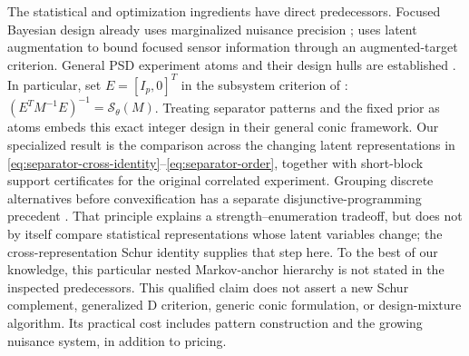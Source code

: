 The statistical and optimization ingredients have direct predecessors.
Focused Bayesian design already uses marginalized nuisance precision
\citep{Alexanderian2021}; \citet[Section 7]{LevineHow2013} uses latent
augmentation to bound focused sensor information through an augmented-target
criterion. General PSD experiment atoms and their design hulls are established
\citep{HarmanTrnovska2009,Filova2026}. In particular, set
$E=[I_p,0]^T$ in the subsystem criterion of
\citet[Theorem 4.3 and Corollaries 4.4--4.5]{Sagnol2015}:
$(E^TM^{-1}E)^{-1}=\mathcal S_\theta(M)$.
Treating separator patterns and the fixed prior as atoms embeds this exact
integer design in their general conic framework. Our specialized result is
the comparison across the changing latent representations in
\eqref{eq:separator-cross-identity}--\eqref{eq:separator-order}, together
with short-block support certificates for the original correlated experiment.
Grouping discrete alternatives before convexification has a separate
disjunctive-programming precedent \citep{Balas1985,Papageorgiou2025}. That
principle explains a strength--enumeration tradeoff, but does not by itself
compare statistical representations whose latent variables change; the
cross-representation Schur identity supplies that step here.
To the best of our knowledge, this particular nested Markov-anchor hierarchy
is not stated in the inspected predecessors. This qualified claim does not
assert a new Schur complement, generalized D criterion, generic conic
formulation, or design-mixture algorithm. Its practical cost includes pattern
construction and the growing nuisance system, in addition to pricing.

